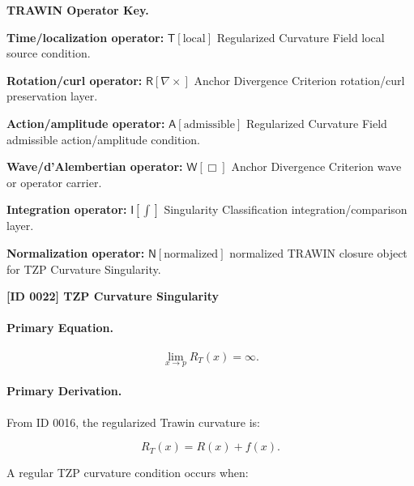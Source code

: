 \par\vspace{0.45\baselineskip}
\noindent\begin{minipage}[t]{\linewidth}
\begingroup
\small
\raggedright
\textbf{TRAWIN Operator Key.}\par
\noindent\textbf{Time/localization operator:} $\mathsf{T}\!\left[\mathrm{local}\right]$ Regularized Curvature Field local source condition.\par
\noindent\textbf{Rotation/curl operator:} $\mathsf{R}\!\left[\nabla\times\right]$ Anchor Divergence Criterion rotation/curl preservation layer.\par
\noindent\textbf{Action/amplitude operator:} $\mathsf{A}\!\left[\mathrm{admissible}\right]$ Regularized Curvature Field admissible action/amplitude condition.\par
\noindent\textbf{Wave/d'Alembertian operator:} $\mathsf{W}\!\left[\Box\right]$ Anchor Divergence Criterion wave or operator carrier.\par
\noindent\textbf{Integration operator:} $\mathsf{I}\!\left[\int\right]$ Singularity Classification integration/comparison layer.\par
\noindent\textbf{Normalization operator:} $\mathsf{N}\!\left[\mathrm{normalized}\right]$ normalized TRAWIN closure object for TZP Curvature Singularity.\par
\endgroup
\end{minipage}

\clearpage
\noindent\textbf{[ID 0022] TZP Curvature Singularity}\par
\vspace{0.35em}
\paragraph{Primary Equation.}
\begin{equation}
\lim_{x\to p}R_T(x)=\infty .
\end{equation}

\paragraph{Primary Derivation.}
From ID 0016, the regularized Trawin curvature is:

\begin{equation}
R_T(x)=R(x)+f(x).
\end{equation}

A regular TZP curvature condition occurs when:

